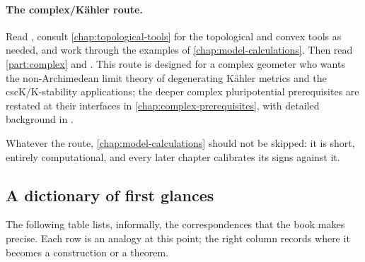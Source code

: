 \paragraph{The complex/K\"ahler route.}
Read , consult
\cref{chap:topological-tools} for the topological and convex tools as needed, and work
through the examples of \cref{chap:model-calculations}.  Then read
\cref{part:complex} and
.
This route is designed for a complex geometer who wants the
non-Archimedean limit theory of degenerating K\"ahler metrics and the
cscK/K-stability applications; the deeper complex pluripotential
prerequisites are restated at their interfaces in
\cref{chap:complex-prerequisites}, with detailed background in
\cite{XiaBook}.

\medskip

Whatever the route, \cref{chap:model-calculations} should not be skipped:
it is short, entirely computational, and every later chapter calibrates its
signs against it.

\subsection{A dictionary of first glances}
\label{sec:ch01-first-glance-dictionary}

The following table lists, informally, the correspondences that the book
makes precise.  Each row is an analogy at this point; the right column
records where it becomes a construction or a theorem.


